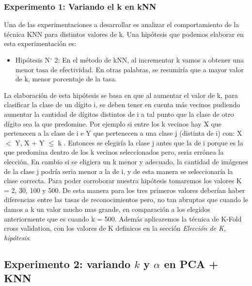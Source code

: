 \subsubsection{Experimento 1: Variando el k en kNN}
Una de las experimentaciones a desarrollar es analizar el comportamiento de la técnica KNN para distintos valores de k. Una hipótesis que podemos elaborar en esta experimentación es: 
\begin{itemize}
\item Hipótesis N$ ^{\circ} $ 2: En el método de kNN, al incrementar k vamos a obtener una menor tasa de efectividad. En otras palabras, se resumiría que a mayor valor de k, menor porcentaje de la tasa.
\end{itemize}
La elaboración de esta hipótesis se basa en que al aumentar el valor de k, para clasificar la clase de un dígito i, se deben tener en cuenta más vecinos pudiendo aumentar la cantidad de dígitos distintos de i a tal punto que la clase de otro dígito sea la que predomine. Por ejemplo si entre los k vecinos hay X que pertenecen a la clase de i e Y que pertenecen a una clase j (distinta de i) con: \newline
 X $<$ Y, X + Y $\leq$ k .\newline
  Entonces se elegiría la clase j antes que la de i porque es la que predomina dentro de los k vecinos seleccionados pero, seria errónea la elección. En cambio si se eligiera un k menor y adecuado, la cantidad de imágenes de la clase j podría seria menor a la de i, y de esta manera se seleccionaría la clase correcta.
Para poder corroborar nuestra hipótesis tomaremos los valores K = 2, 30, 100 y 500. De esta manera para los tres primeros valores deberían haber diferencias entre las tasas de reconocimientos pero, no tan abruptas que cuando le damos a k un valor mucho mas grande, en comparación a los elegidos anteriormente que es cuando k = 500. Además aplicaremos la técnica de K-Fold cross validation, con los valores de K definicos en la sección  \textit{Elección de K, hipótesis}. 

\subsection{Experimento 2: variando $k$ y $\alpha$ en PCA + KNN}
